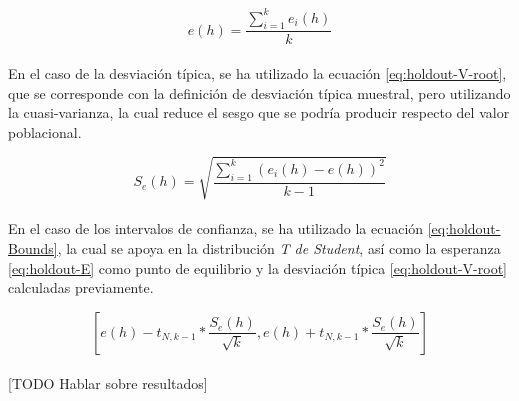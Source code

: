 \documentclass{article}
\begin{document}
		\begin{equation}
		\label{eq:holdout-E}
				e(h) = \frac{\sum_{i=1}^k e_i(h)}{k}
		\end{equation}

		\paragraph{}
		En el caso de la desviación típica, se ha utilizado la ecuación \eqref{eq:holdout-V-root}, que se corresponde con la definición de desviación típica muestral, pero utilizando la cuasi-varianza, la cual reduce el sesgo que se podría producir respecto del valor poblacional.

		\begin{equation}
		\label{eq:holdout-V-root}
				S_e(h) = \sqrt{\frac{\sum_{i=1}^k (e_i(h)-e(h))^2}{k-1}}
		\end{equation}


		\paragraph{}
		En el caso de los intervalos de confianza, se ha utilizado la ecuación \eqref{eq:holdout-Bounds}, la cual se apoya en la distribución \emph{T de Student}, así como la esperanza \eqref{eq:holdout-E} como punto de equilibrio y la desviación típica \eqref{eq:holdout-V-root} calculadas previamente.

		\begin{equation}
		\label{eq:holdout-Bounds}
			[e(h)-t_{N, k-1} * \frac{S_e(h)}{\sqrt{k}},e(h)+t_{N, k-1} * \frac{S_e(h)}{\sqrt{k}}]
		\end{equation}

		\paragraph{}
		[TODO Hablar sobre resultados]
\end{document}
